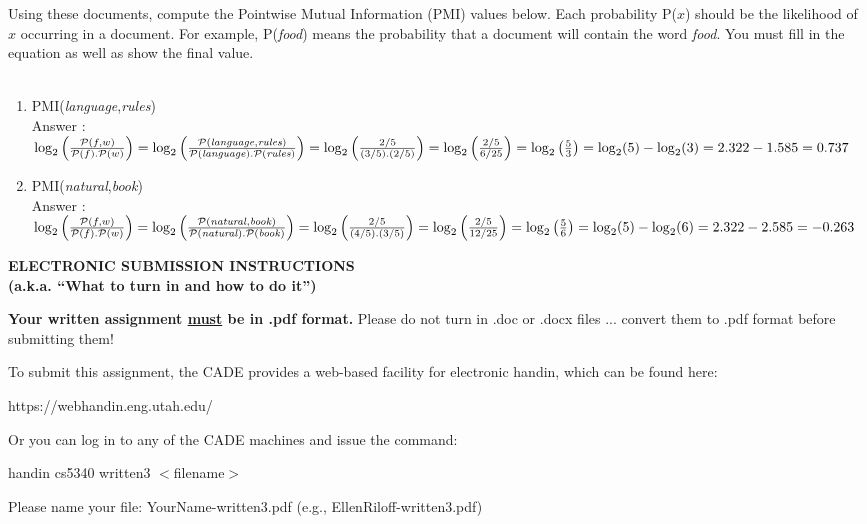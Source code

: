 \documentclass[11pt]{article}
\begin{document}
\begin{enumerate}
Using these documents, compute the Pointwise Mutual
Information (PMI) values below. Each probability P($x$) should be the likelihood of
$x$ occurring in a document. For example, P({\it food}) means the probability
that a document will contain the word {\it food}. You must fill in the
equation as well as show the final value.  \\ ~ \\

\begin{enumerate}
\item PMI({\it language},{\it rules}) \\ Answer : $\log_2\left(\frac{\mathcal{P}(f,w)}{\mathcal{P}(f).\mathcal{P}(w)}\right) = \log_2\left(\frac{\mathcal{P}({\it language},{\it rules})}{\mathcal{P}({\it language}).\mathcal{P}({\it rules})}\right) = \log_2\left(\frac{2/5}{(3/5).(2/5)}\right) = \log_2\left(\frac{2/5}{6/25}\right) = \log_2\left(\frac{5}{3}\right) = \log_2 (5) - \log_2 (3) = 2.322 - 1.585 = 0.737$ \\

\item PMI({\it natural},{\it book}) \\ Answer : $\log_2\left(\frac{\mathcal{P}(f,w)}{\mathcal{P}(f).\mathcal{P}(w)}\right) = \log_2\left(\frac{\mathcal{P}({\it natural},{\it book})}{\mathcal{P}({\it natural}).\mathcal{P}({\it book})}\right) = \log_2\left(\frac{2/5}{(4/5).(3/5)}\right) = \log_2\left(\frac{2/5}{12/25}\right) = \log_2\left(\frac{5}{6}\right) = \log_2 (5) - \log_2 (6) = 2.322 - 2.585 = -0.263$ \\

\end{enumerate}



\end{enumerate}  %



\newpage
\hspace*{1.5in}  {\bf ELECTRONIC SUBMISSION INSTRUCTIONS \\
\hspace*{1.5in} (a.k.a. ``What to turn in and   how to do it'')} 

{\bf Your written assignment \underline{must} be in .pdf format.} Please do not turn in
.doc or .docx files ... convert them to .pdf format before submitting them!

To submit this assignment, the CADE provides a web-based
facility for electronic handin, which can be found here:
\begin{center}
https://webhandin.eng.utah.edu/
\end{center}
Or you can log in to any of the CADE machines and issue the command:
\begin{center}
handin cs5340 written3 $<$filename$>$
\end{center}
Please name your file: YourName-written3.pdf (e.g., EllenRiloff-written3.pdf)\\
\end{document}
